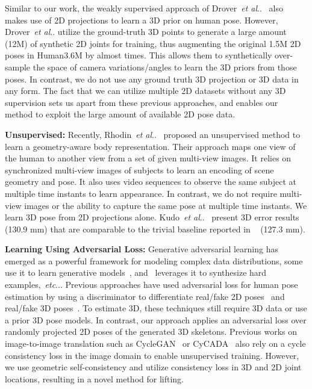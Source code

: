 \documentclass[10pt,twocolumn,letterpaper]{article}
\makeatletter
\DeclareRobustCommand\onedot{\futurelet\@let@token\@onedot}
\def\@onedot{\ifx\@let@token.\else.\null\fi\xspace}
\def\etc{\emph{etc}\onedot} \def\vs{\emph{vs}\onedot}
\def\etal{\emph{et al}\onedot}
\makeatother
\begin{document}
Similar to our work, the weakly supervised approach of Drover~\etal~\cite{ZedNet_2018_ECCVW} also makes use of 2D projections to learn a 3D prior on human pose. However, Drover~\etal utilize the ground-truth 3D points to generate a large amount (12M) of synthetic 2D joints for training, thus augmenting the original 1.5M 2D poses in Human3.6M by almost  times. This allows them to synthetically over-sample the space of camera variations/angles to learn the 3D priors from those poses. In contrast, we do not use any ground truth 3D projection or 3D data in any form. The fact that we can utilize multiple 2D datasets without any 3D supervision sets us apart from these previous approaches, and enables our method to exploit the large amount of available 2D pose data.





\textbf{Unsupervised:} Recently, Rhodin~\etal~\cite{Rhodin_2018_ECCV} proposed an unsupervised method to learn a geometry-aware body representation. Their approach maps one view of the human to another view from a set of given multi-view images. It relies on synchronized multi-view images of subjects to learn an encoding of scene geometry and pose. It also uses video sequences to observe the same subject at multiple time instants to learn appearance. In contrast, we do not require multi-view images or the ability to capture the same pose at multiple time instants. We learn 3D pose from 2D projections alone. Kudo~\etal~\cite{kudo2018unsupervised} present 3D error results (130.9 mm) that are comparable to the trivial baseline reported in ~\cite{ZedNet_2018_ECCVW} (127.3 mm).


\textbf{Learning Using Adversarial Loss:} Generative adversarial learning has emerged as a powerful framework for modeling complex data distributions, some use it to learn generative models~\cite{GAN,CyCADA,CycleGANICCV2017}, and~\cite{shat2019rem} leverages it to synthesize hard examples,~\etc. Previous approaches have used adversarial loss for human pose estimation by using a discriminator to differentiate real/fake 2D poses~\cite{Chen_2017_ICCV} and real/fake 3D poses~\cite{Tung_2017_ICCV,Black2018}. To estimate 3D, these techniques still require 3D data or use a prior 3D pose models. In contrast, our approach applies an adversarial loss over randomly projected 2D poses of the generated 3D skeletons. Previous works on image-to-image translation such as CycleGAN~\cite{CycleGANICCV2017} or CyCADA~\cite{CyCADA} also rely on a cycle consistency loss in the image domain to enable unsupervised training. However, we use geometric self-consistency and utilize consistency loss in 3D and 2D joint locations, resulting in a novel method for lifting.
\end{document}

